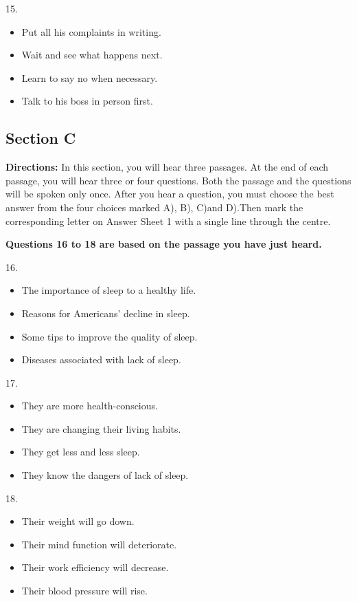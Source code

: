 \documentclass[UTF8,11pt]{ctexart}
\begin{document}
15.


\begin{itemize}[leftmargin=2em,itemsep=.2em,topsep=.4em]\item[A.] Put all his complaints in writing.
\item[B.] Wait and see what happens next.
\item[C.] Learn to say no when necessary.
\item[D.] Talk to his boss in person first.
\end{itemize}

\subsection*{\textbf{Section C}}


\textbf{Directions:} In this section, you will hear three passages. At the end of each passage, you will hear three or four questions. Both the passage and the questions will be spoken only once. After you hear a question, you must choose the best answer from the four choices marked A), B), C)and D).Then mark the corresponding letter on Answer Sheet 1 with a single line through the centre.


\textbf{Questions 16 to 18 are based on the passage you have just heard.}


16.


\begin{itemize}[leftmargin=2em,itemsep=.2em,topsep=.4em]\item[A.] The importance of sleep to a healthy life.
\item[B.] Reasons for Americans' decline in sleep.
\item[C.] Some tips to improve the quality of sleep.
\item[D.] Diseases associated with lack of sleep.
\end{itemize}

17.


\begin{itemize}[leftmargin=2em,itemsep=.2em,topsep=.4em]\item[A.] They are more health-conscious.
\item[B.] They are changing their living habits.
\item[C.] They get less and less sleep.
\item[D.] They know the dangers of lack of sleep.
\end{itemize}

18.


\begin{itemize}[leftmargin=2em,itemsep=.2em,topsep=.4em]\item[A.] Their weight will go down.
\item[B.] Their mind function will deteriorate.
\item[C.] Their work efficiency will decrease.
\item[D.] Their blood pressure will rise.
\end{itemize}
\end{document}
